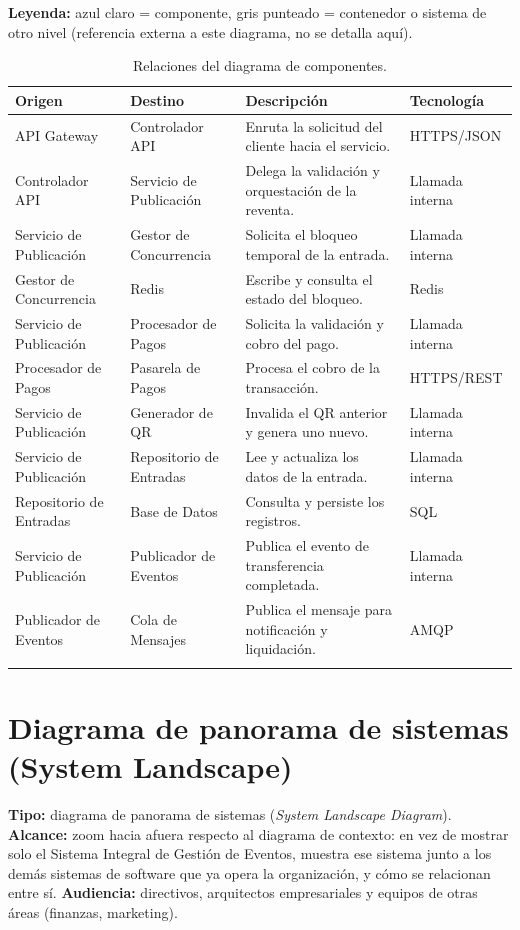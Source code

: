 \documentclass[12pt,a4paper]{article}
\begin{document}
\textbf{Leyenda:} azul claro = componente, gris punteado = contenedor o sistema de otro nivel
(referencia externa a este diagrama, no se detalla aquí).

\begin{longtable}{p{3.2cm}p{3.2cm}p{5.7cm}p{2.3cm}}
\toprule
\textbf{Origen} & \textbf{Destino} & \textbf{Descripción} & \textbf{Tecnología}\\
\midrule
API Gateway & Controlador API & Enruta la solicitud del cliente hacia el servicio. & HTTPS/JSON\\
Controlador API & Servicio de Publicación & Delega la validación y orquestación de la reventa. & Llamada interna\\
Servicio de Publicación & Gestor de Concurrencia & Solicita el bloqueo temporal de la entrada. & Llamada interna\\
Gestor de Concurrencia & Redis & Escribe y consulta el estado del bloqueo. & Redis\\
Servicio de Publicación & Procesador de Pagos & Solicita la validación y cobro del pago. & Llamada interna\\
Procesador de Pagos & Pasarela de Pagos & Procesa el cobro de la transacción. & HTTPS/REST\\
Servicio de Publicación & Generador de QR & Invalida el QR anterior y genera uno nuevo. & Llamada interna\\
Servicio de Publicación & Repositorio de Entradas & Lee y actualiza los datos de la entrada. & Llamada interna\\
Repositorio de Entradas & Base de Datos & Consulta y persiste los registros. & SQL\\
Servicio de Publicación & Publicador de Eventos & Publica el evento de transferencia completada. & Llamada interna\\
Publicador de Eventos & Cola de Mensajes & Publica el mensaje para notificación y liquidación. & AMQP\\
\bottomrule
\caption{Relaciones del diagrama de componentes.}
\end{longtable}

\section{Diagrama de panorama de sistemas (System Landscape)}

\textbf{Tipo:} diagrama de panorama de sistemas (\textit{System Landscape Diagram}).
\textbf{Alcance:} zoom hacia afuera respecto al diagrama de contexto: en vez de mostrar solo el
Sistema Integral de Gestión de Eventos, muestra ese sistema junto a los demás sistemas de software
que ya opera la organización, y cómo se relacionan entre sí. \textbf{Audiencia:} directivos,
arquitectos empresariales y equipos de otras áreas (finanzas, marketing).
\end{document}
